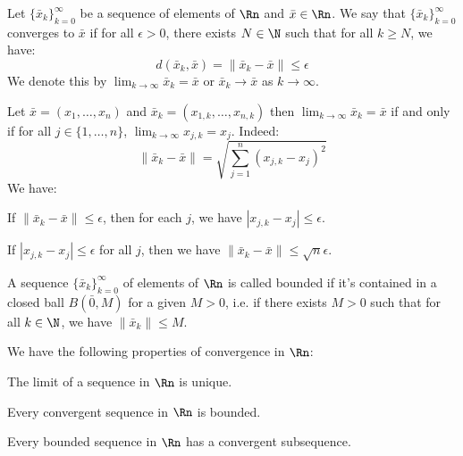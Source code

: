 \begin{definition}
    Let $\{\bar{x}_k\}_{k = 0}^{\infty}$ be a sequence of elements of $\Rn$ and $\bar{x} \in \Rn$. We say that $\{\bar{x}_k\}_{k = 0}^{\infty}$ converges to $\bar{x}$ if for all $\epsilon > 0$, there exists $N \in \N$ such that for all $k \geq N$, we have:
    \[
        d(\bar{x}_k, \bar{x}) = \| \bar{x}_k - \bar{x} \| \leq \epsilon
    \]
    We denote this by $\lim_{k \to \infty} \bar{x}_k = \bar{x}$ or $\bar{x}_k \to \bar{x}$ as $k \to \infty$.
\end{definition}
Let $\bar{x} = (x_1, \ldots, x_n)$ and $\bar{x}_k = (x_{1,k}, \ldots, x_{n,k})$ then $\lim_{k \to \infty} \bar{x}_k = \bar{x}$ if and only if for all $j \in \{1, \ldots, n\}$, $\lim_{k \to \infty} x_{j,k} = x_j$. Indeed:
\[
    \| \bar{x}_k - \bar{x} \| = \sqrt{\sum_{j = 1}^{n} (x_{j,k} - x_j)^2}
\]
We have:
\begin{citemize}
    \item If $\| \bar{x}_k - \bar{x} \| \leq \epsilon$, then for each $j$, we have $|x_{j,k} - x_j| \leq \epsilon$.
    \item If $|x_{j,k} - x_j | \leq \epsilon$ for all $j$, then we have $\| \bar{x}_k - \bar{x} \| \leq \sqrt{n}\epsilon$.
\end{citemize}

\begin{definition}
    A sequence $\{\bar{x}_k\}_{k = 0}^{\infty}$ of elements of $\Rn$ is called bounded if it's contained in a closed ball $B(\bar{0}, M)$ for a given $M > 0$, i.e. if there exists $M > 0$ such that for all $k \in \N$, we have $\|\bar{x}_k\| \leq M$.
\end{definition}
We have the following properties of convergence in $\Rn$:
\begin{citemize}
    \item The limit of a sequence in $\Rn$ is unique.
    \item Every convergent sequence in $\Rn$ is bounded.
\end{citemize}

\begin{theorem}
    Every bounded sequence in $\Rn$ has a convergent subsequence.
\end{theorem}

